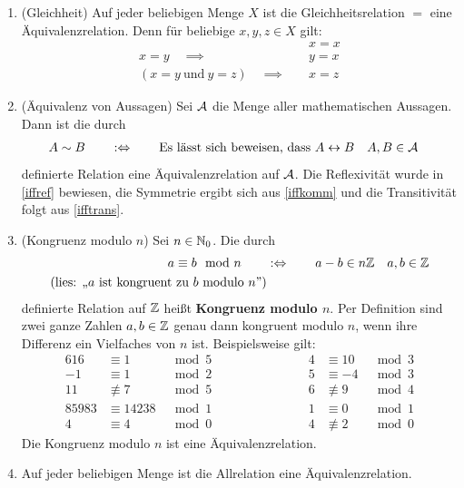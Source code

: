 \begin{bsp} \label{bsp:aequirel}  \quad
    \begin{enumerate}
        \item(Gleichheit) Auf jeder beliebigen Menge $X$ ist die Gleichheitsrelation $=$ eine Äquivalenzrelation. Denn für beliebige $x,y,z\in X$ gilt:
        \begin{align*}
            & x = x \\
            x=y\quad \implies\quad & y=x \\
            (x=y\ \text{und}\ y=z) \quad\implies\quad & x=z
        \end{align*}
        \item(Äquivalenz von Aussagen) Sei $\mathcal A$ die Menge aller mathematischen Aussagen. Dann ist die durch
        \begin{align*}
            A\sim B \qquad&:\Leftrightarrow\qquad \text{Es lässt sich beweisen, dass $A\leftrightarrow B$} && A,B\in\mathcal A
        \end{align*}
        definierte Relation eine Äquivalenzrelation auf $\mathcal A$. Die Reflexivität wurde in \cref{iffref} bewiesen, die Symmetrie ergibt sich aus \cref{iffkomm} und die Transitivität folgt aus \cref{ifftrans}.
        \item(Kongruenz modulo $n$) Sei $n\in \mathbb N_0$. Die durch
        \begin{align*}
            a\equiv b\mod n \qquad& :\Leftrightarrow\qquad a-b\in n\mathbb Z && a,b\in \mathbb Z \\
            (\text{lies: „$a$ ist kongruent zu $b$ modulo $n$”})
        \end{align*}
        definierte Relation auf $\mathbb Z$ heißt \textbf{Kongruenz modulo $n$}. Per Definition sind zwei ganze Zahlen $a,b\in \mathbb Z$ genau dann kongruent modulo $n$, wenn ihre Differenz ein Vielfaches von $n$ ist. Beispielsweise gilt:
        \begin{alignat*}{6}
            16 &\equiv 1&\mod 5 \qquad&\qquad&\qquad  4 &\equiv 10 &\mod 3 \\
            -1&\equiv 1 &\mod 2 \qquad&\qquad&\qquad  5 &\equiv -4 &\mod 3 \\
            11 &\not\equiv 7 &\mod 5 \qquad&\qquad&\qquad 6 &\not\equiv 9 &\mod 4 \\
            85983 &\equiv 14238 &\mod 1 \qquad&\qquad&\qquad  1 &\equiv 0 &\mod 1 \\
            4 &\equiv 4 &\mod 0 \qquad&\qquad&\qquad  4 &\not \equiv 2 &\mod 0
        \end{alignat*}
        Die Kongruenz modulo $n$ ist eine Äquivalenzrelation.
        \item Auf jeder beliebigen Menge ist die Allrelation eine Äquivalenzrelation.
    \end{enumerate}
\end{bsp}


